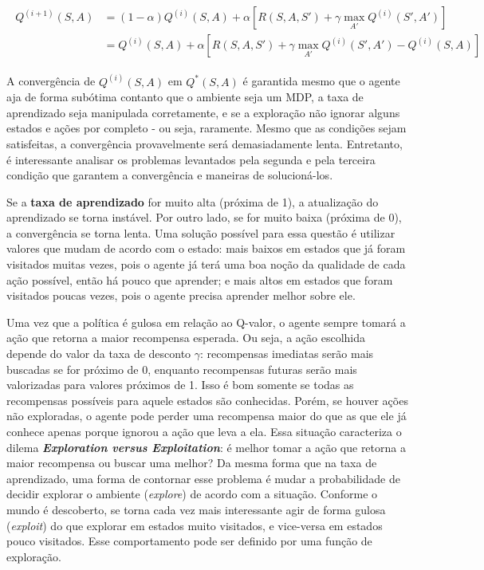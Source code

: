 \begin{align}
\begin{split}
Q^{(i+1)}(S,A) &= (1-\alpha)Q^{(i)}(S,A) + \alpha[R(S,A,S') + \gamma \max_{A'}Q^{(i)}(S',A')] \\
            &= Q^{(i)}(S,A) + \alpha[R(S,A,S') + \gamma \max_{A'}Q^{(i)}(S',A') - Q^{(i)}(S,A)]
\end{split}
\label{eq:q_update}
\end{align}

A convergência de $Q^{(i)}(S,A)$ em $Q^{*}(S,A)$ é garantida mesmo que o agente aja de forma subótima contanto que o ambiente seja um MDP, a taxa de aprendizado seja manipulada corretamente, e se a exploração não ignorar alguns estados e ações por completo - ou seja, raramente.
Mesmo que as condições sejam satisfeitas, a convergência provavelmente será demasiadamente lenta.
Entretanto, é interessante analisar os problemas levantados pela segunda e pela terceira condição que garantem a convergência e maneiras de solucioná-los.

Se a \textbf{taxa de aprendizado} for muito alta (próxima de 1), a atualização do aprendizado se torna instável.
Por outro lado, se for muito baixa (próxima de 0), a convergência se torna lenta.
Uma solução possível para essa questão é utilizar valores que mudam de acordo com o estado:
mais baixos em estados que já foram visitados muitas vezes, pois o agente já terá uma boa noção da qualidade de cada ação possível, então há pouco que aprender;
e mais altos em estados que foram visitados poucas vezes, pois o agente precisa aprender melhor sobre ele.

Uma vez que a política é gulosa em relação ao Q-valor, o agente sempre tomará a ação que retorna a maior recompensa esperada.
Ou seja, a ação escolhida depende do valor da taxa de desconto $\gamma$: recompensas imediatas serão mais buscadas se for próximo de 0, enquanto recompensas futuras serão mais valorizadas para valores próximos de 1.
Isso é bom somente se todas as recompensas possíveis para aquele estados são conhecidas.
Porém, se houver ações não exploradas, o agente pode perder uma recompensa maior do que as que ele já conhece apenas porque ignorou a ação que leva a ela.
Essa situação caracteriza o dilema \textbf{\textit{Exploration versus Exploitation}}: é melhor tomar a ação que retorna a maior recompensa ou buscar uma melhor?
Da mesma forma que na taxa de aprendizado, uma forma de contornar esse problema é mudar a probabilidade de decidir explorar o ambiente (\textit{explore}) de acordo com a situação.
Conforme o mundo é descoberto, se torna cada vez mais interessante agir de forma gulosa (\textit{exploit}) do que explorar em estados muito visitados, e vice-versa em estados pouco visitados.
Esse comportamento pode ser definido por uma função de exploração.

